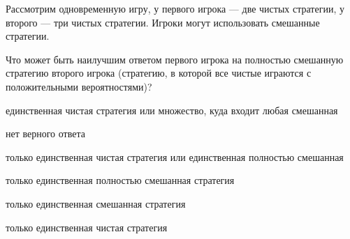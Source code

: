 
\begin{question}
Рассмотрим одновременную игру, у первого игрока --- две чистых стратегии,
у второго --- три чистых стратегии. Игроки могут использовать смешанные стратегии.

Что может быть наилучшим ответом первого игрока на полностью смешанную стратегию второго игрока (стратегию, в которой все чистые играются с положительными вероятностями)?
\begin{answerlist}
  \item единственная чистая стратегия или множество, куда входит любая смешанная
  \item нет верного ответа
  \item только единственная чистая стратегия или единственная полностью смешанная
  \item только единственная полностью смешанная стратегия
  \item только единственная смешанная стратегия
  \item только единственная чистая стратегия
\end{answerlist}
\end{question}


